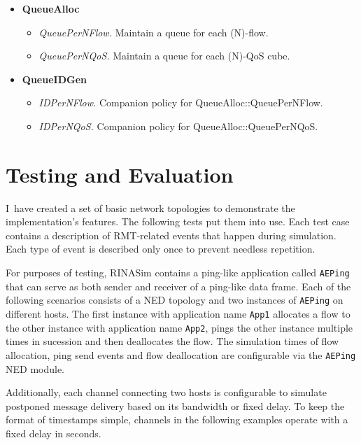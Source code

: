         \begin{itemize}
            \item \textbf{QueueAlloc}
            \begin{itemize}
                \item \emph{QueuePerNFlow.} Maintain a queue for each (N)-flow.
                \item \emph{QueuePerNQoS.} Maintain a queue for each (N)-QoS cube.
            \end{itemize}
            \item \textbf{QueueIDGen}
            \begin{itemize}
                \item \emph{IDPerNFlow.} Companion policy for QueueAlloc::QueuePerNFlow.
                \item \emph{IDPerNQoS.} Companion policy for QueueAlloc::QueuePerNQoS.
            \end{itemize}
        \end{itemize}


\chapter{Testing and Evaluation}\label{testing}

    I~have created a set of basic network topologies to demonstrate the implementation's features. The following tests put them into use.
    Each test case contains a description of RMT-related events that happen during simulation. Each type of event is described only once to prevent needless repetition.

    For purposes of testing, RINASim contains a ping-like application called \texttt{AEPing} that can serve as both sender and receiver of a ping-like data frame. Each of the following scenarios consists of a NED topology and two instances of \texttt{AEPing} on different hosts. The first instance with application name \texttt{App1} allocates a flow to the other instance with application name \texttt{App2}, pings the other instance multiple times in sucession and then deallocates the flow. The simulation times of flow allocation, ping send events and flow deallocation are configurable via the \texttt{AEPing} NED module.

    Additionally, each channel connecting two hosts is configurable to simulate postponed message delivery based on its bandwidth or fixed delay. To keep the format of timestamps simple, channels in the following examples operate with a fixed delay in seconds.

